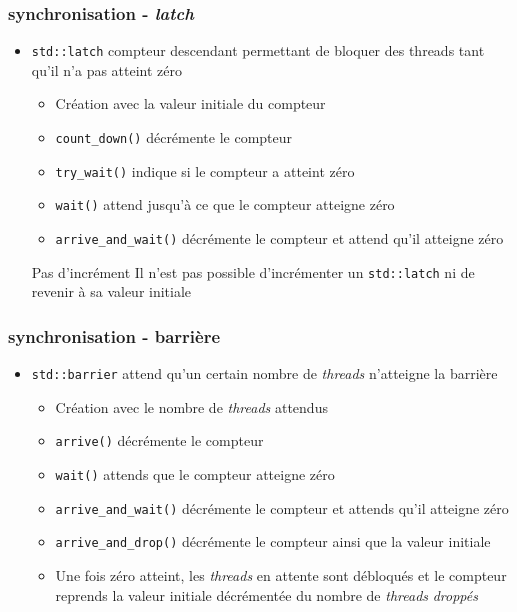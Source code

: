 \documentclass[C++.tex]{subfiles}
\begin{document}
\begin{frame}[fragile]
	\frametitle{synchronisation - \textit{latch}}


	\begin{itemize}
		\item \lstinline|std::latch| compteur descendant permettant de bloquer des threads tant qu'il n'a pas atteint zéro 
		\begin{itemize}
			\item Création avec la valeur initiale du compteur
			\item \lstinline|count_down()| décrémente le compteur
			\item \lstinline|try_wait()| indique si le compteur a atteint zéro
			\item \lstinline|wait()| attend jusqu'à ce que le compteur atteigne zéro
			\item \lstinline|arrive_and_wait()| décrémente le compteur et attend qu'il atteigne zéro
		\end{itemize}

		\begin{alertblock}{Pas d'incrément}
			Il n'est pas possible d'incrémenter un \lstinline|std::latch| ni de revenir à sa valeur initiale
		\end{alertblock}
	\end{itemize}
\end{frame}

\begin{frame}[fragile]
	\frametitle{synchronisation - barrière}
	\begin{itemize}
		\item \lstinline|std::barrier| attend qu'un certain nombre de \textit{threads} n'atteigne la barrière
		\begin{itemize}
			\item Création avec le nombre de \textit{threads} attendus
			\item \lstinline|arrive()| décrémente le compteur
			\item \lstinline|wait()| attends que le compteur atteigne zéro
			\item \lstinline|arrive_and_wait()| décrémente le compteur et attends qu'il atteigne zéro
			\item \lstinline|arrive_and_drop()| décrémente le compteur ainsi que la valeur initiale
			\item Une fois zéro atteint, les \textit{threads} en attente sont débloqués et le compteur reprends la valeur initiale décrémentée du nombre de \textit{threads} \og \textit{droppés}\fg{}
		\end{itemize}
	\end{itemize}
\end{frame}
\end{document}
